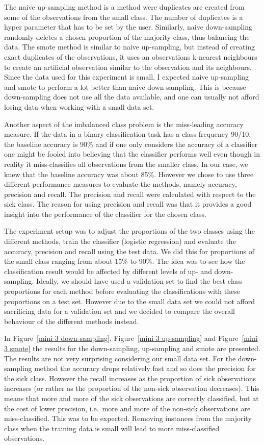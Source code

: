 \documentclass[11pt,twoside,swedish]{article}
\begin{document}
The naive up-sampling method is a method were duplicates are created
from some of the observations from the small class. The number of
duplicates is a hyper parameter that has to be set by the
user. Similarly, naive down-sampling randomly deletes a chosen
proportion of the majority class, thus balancing the data. The smote
method is similar to naive up-sampling, but instead of creating exact
duplicates of the observations, it uses an observations k-nearest
neighbours to create an artificial observation similar to the
observation and its neighbours. Since the data used for this
experiment is small, I expected naive up-sampling and smote to perform
a lot better than naive down-sampling. This is because down-sampling
does not use all the data available, and one can usually not afford
losing data when working with a small data set. 

Another aspect of the imbalanced class problem is the miss-leading
accuracy measure. If the data in a binary classification task has a
class frequency 90/10, the baseline accuracy is 90\% and if one only
considers the accuracy of a classifier one might be fooled into
believing that the classifier performs well even though in reality it
miss-classifies all observations from the smaller class. In our case,
we knew that the baseline accuracy was about 85\%. However we chose to
use three different performance measures to evaluate the methods,
namely accuracy, precision and recall. The precision and recall were
calculated with respect to the sick class. The reason for using
precision and recall was that it provides a good insight into the
performance of the classifier for the chosen class.

The experiment setup was to adjust the proportions of the two classes
using the different methods, train the classifier (logistic
regression) and evaluate the accuracy, precision and recall using the
test data. We did this for proportions of the small class ranging from
about 15\% to 90\%. The idea was to see how the classification result
would be affected by different levels of up- and
down-sampling. Ideally, we should have used a validation set to find the
best class proportions for each method before evaluating the
classifications with these proportions on a test set. However due to
the small data set we could not afford sacrificing data for a
validation set and we decided to compare the overall behaviour of the
different methods instead.

In Figure~\ref{mini 3 down-sampling}, Figure~\ref{mini 3 up-sampling}
and Figure~\ref{mini 3 smote} the results for the down-sampling,
up-sampling and smote are presented. The results are not very
surprising considering our small data set. For the down-sampling
method the accuracy drops relatively fast and so does the precision
for the sick class. However the recall increases as the proportion of
sick observations increases (or rather as the proportion of the
non-sick observation decreases). This means that more and more of the
sick observations are correctly classified, but at the cost of
lower precision, i.e.\ more and more of the non-sick observations are
miss-classified. This was to be expected. Removing instances from the
majority class when the training data is small will lead to more
miss-classified observations.
\end{document}
